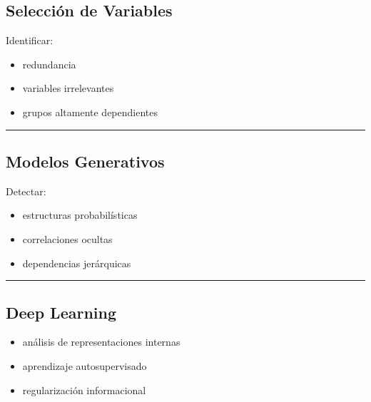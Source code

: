 \documentclass[letterpaper,10pt,english]{jupyterBook}
\begin{document}
\subsection{Selección de Variables}
\label{\detokenize{03_multivariate_models/mi_matrix:seleccion-de-variables}}
\sphinxAtStartPar
Identificar:
\begin{itemize}
\item {} 
\sphinxAtStartPar
redundancia

\item {} 
\sphinxAtStartPar
variables irrelevantes

\item {} 
\sphinxAtStartPar
grupos altamente dependientes

\end{itemize}


\bigskip\hrule\bigskip



\subsection{Modelos Generativos}
\label{\detokenize{03_multivariate_models/mi_matrix:modelos-generativos}}
\sphinxAtStartPar
Detectar:
\begin{itemize}
\item {} 
\sphinxAtStartPar
estructuras probabilísticas

\item {} 
\sphinxAtStartPar
correlaciones ocultas

\item {} 
\sphinxAtStartPar
dependencias jerárquicas

\end{itemize}


\bigskip\hrule\bigskip



\subsection{Deep Learning}
\label{\detokenize{03_multivariate_models/mi_matrix:deep-learning}}\begin{itemize}
\item {} 
\sphinxAtStartPar
análisis de representaciones internas

\item {} 
\sphinxAtStartPar
aprendizaje auto\sphinxhyphen{}supervisado

\item {} 
\sphinxAtStartPar
regularización informacional

\end{itemize}
\end{document}
